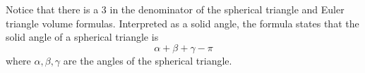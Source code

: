 \begin{remark} Notice that there is a $3$ in the denominator of the
spherical triangle and Euler triangle volume formulas.  Interpreted
as a solid angle, the formula states that the solid angle of a
spherical triangle is $$\alpha + \beta + \gamma - \pi$$ where
$\alpha,\beta,\gamma$ are the angles of the spherical triangle.
\end{remark}








